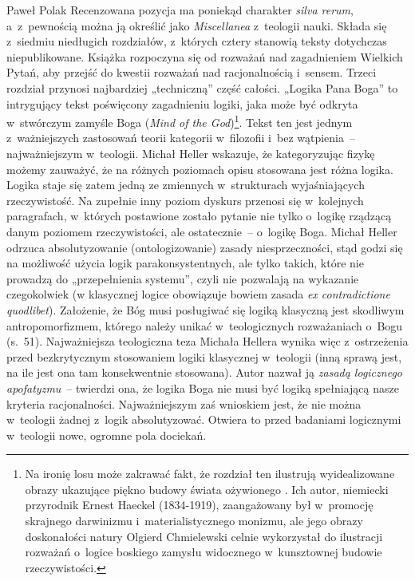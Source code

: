 \begin{recplenv}{Paweł Polak}
Recenzowana pozycja ma poniekąd charakter \textit{silva rerum}, a~z~pewnością
można ją określić jako \textit{Miscellanea} z~teologii nauki. Składa się z~siedmiu
niedługich rozdziałów, z~których cztery stanowią teksty dotychczas niepublikowane. Książka rozpoczyna się od rozważań
nad zagadnieniem Wielkich Pytań, aby przejść do kwestii rozważań nad racjonalnością i~sensem. Trzeci rozdział przynosi
najbardziej „techniczną” część całości. „Logika Pana Boga” to intrygujący tekst poświęcony zagadnieniu logiki, jaka
może być odkryta w~stwórczym zamyśle Boga (\textit{Mind of the God})\footnote{Na
ironię losu może zakrawać fakt, że rozdział ten ilustrują wyidealizowane obrazy ukazujące piękno budowy świata
ożywionego
\parencite{haeckel_kunstformen_1904}.
Ich autor, niemiecki przyrodnik Ernest Haeckel (1834-1919), zaangażowany był w~promocję
skrajnego darwinizmu i~materialistycznego monizmu, ale jego obrazy doskonałości natury Olgierd Chmielewski celnie
wykorzystał do ilustracji rozważań o~logice boskiego zamysłu widocznego w~kunsztownej budowie rzeczywistości.}. Tekst
ten jest jednym z~ważniejszych zastosowań teorii kategorii w~filozofii i~bez wątpienia~-- najważniejszym w~teologii.
Michał Heller wskazuje, że kategoryzując fizykę możemy zauważyć, że na różnych poziomach opisu stosowana jest różna
logika. Logika staje się zatem jedną ze zmiennych w~strukturach wyjaśniających rzeczywistość. Na zupełnie inny poziom
dyskurs przenosi się w~kolejnych paragrafach, w~których postawione zostało pytanie nie tylko o~logikę rządzącą danym
poziomem rzeczywistości, ale ostatecznie~-- o~logikę Boga. Michał Heller odrzuca absolutyzowanie (ontologizowanie)
zasady niesprzeczności, stąd godzi się na możliwość użycia logik parakonsystentnych, ale tylko takich, które nie
prowadzą do „przepełnienia systemu”, czyli nie pozwalają na wykazanie czegokolwiek (w klasycznej logice obowiązuje
bowiem zasada \textit{ex contradictione quodlibet}). Założenie, że Bóg musi
posługiwać się logiką klasyczną jest skodliwym antropomorfizmem, którego należy unikać w~teologicznych rozważaniach o~Bogu
(s.~51). Najważniejsza teologiczna teza Michała Hellera wynika więc z~ostrzeżenia przed bezkrytycznym stosowaniem
logiki klasycznej w~teologii (inną sprawą jest, na ile jest ona tam konsekwentnie stosowana). Autor nazwał ją
\textit{zasadą logicznego apofatyzmu}~-- twierdzi ona, że logika Boga nie musi być
logiką spełniającą nasze kryteria racjonalności. Najważniejszym zaś wnioskiem jest, że nie można w~teologii żadnej z~logik
absolutyzować. Otwiera to przed badaniami logicznymi w~teologii nowe, ogromne pola dociekań.


\end{recplenv}
